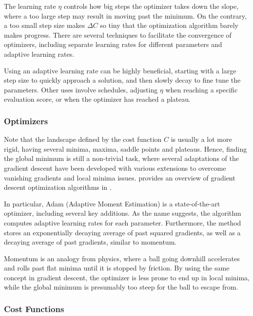             The learning rate $\eta$ controls how big steps the optimizer takes down the slope, where a too large step may result in moving past the minimum. On the contrary, a too small step size makes $\Delta C$ so tiny that the optimization algorithm barely makes progress. There are several techniques to facilitate the convergence of optimizers, including separate learning rates for different parameters and adaptive learning rates.
            
            Using an adaptive learning rate can be highly beneficial, starting with a large step size to quickly approach a solution, and then slowly decay to fine tune the parameters. Other uses involve schedules, adjusting $\eta$ when reaching a specific evaluation score, or when the optimizer has reached a plateau.
        
        \subsubsection{Optimizers}
        
            Note that the landscape defined by the cost function $C$ is usually a lot more rigid, having several minima, maxima, saddle points and plateaus. Hence, finding the global minimum is still a non-trivial task, where several adaptations of the gradient descent have been developed with various extensions to overcome vanishing gradients and local minima issues. 
            \citeauthor{ruder2017overview} provides an overview of gradient descent optimization algorithms in \cite{ruder2017overview}.
            
            In particular, Adam (Adaptive Moment Estimation) is a state-of-the-art optimizer, including several key additions. As the name suggests, the algorithm computes adaptive learning rates for each parameter. Furthermore, the method stores an exponentially decaying average of past squared gradients, as well as a decaying average of past gradients, similar to momentum.
            
            Momentum is an analogy from physics, where a ball going downhill accelerates and rolls past flat minima until it is stopped by friction. By using the same concept in gradient descent, the optimizer is less prone to end up in local minima, while the global minimum is presumably too steep for the ball to escape from.

        \subsubsection{Cost Functions}
        
